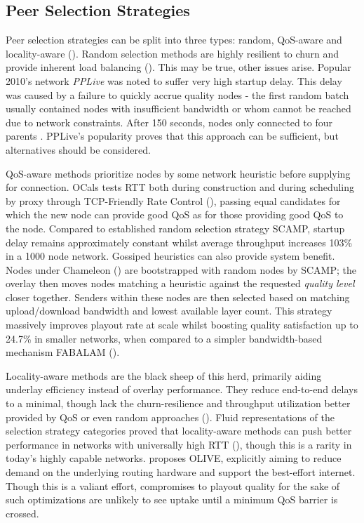 \documentclass[12pt,a4paper]{article}
\begin{document}
\subsection{Peer Selection Strategies} \label{litreview:selection}
Peer selection strategies can be split into three types: random, QoS-aware and locality-aware (\cite{Kim2018}). Random selection methods are highly resilient to churn and provide inherent load balancing  (\cite{Wang2013}). This may be true, other issues arise. Popular 2010's network \textit{PPLive} was noted to suffer very high startup delay. This delay was caused by a failure to quickly accrue quality nodes - the first random batch usually contained nodes with insufficient bandwidth or whom cannot be reached due to network constraints. After 150 seconds, nodes only connected to four parents \cite{Hei2008}. PPLive's popularity proves that this approach can be sufficient, but alternatives should be considered.

QoS-aware methods prioritize nodes by some network heuristic before supplying for connection. OCals tests RTT both during construction and during scheduling by proxy through TCP-Friendly Rate Control (\cite{Floyd2000}), passing equal candidates for which the new node can provide good QoS as for those providing good QoS to the node. Compared to established random selection strategy SCAMP, startup delay remains approximately constant whilst average throughput increases 103\% in a 1000 node network. Gossiped heuristics can also provide system benefit. Nodes under Chameleon (\cite{Nguyen2010}) are bootstrapped with random nodes by SCAMP; the overlay then moves nodes matching a heuristic against the requested \textit{quality level} closer together. Senders within these nodes are then selected based on matching upload/download bandwidth and lowest available layer count. This strategy massively improves playout rate at scale  whilst boosting quality satisfaction up to 24.7\% in smaller networks, when compared to a simpler bandwidth-based mechanism FABALAM (\cite{Liu2004}).

Locality-aware methods are the black sheep of this herd, primarily aiding underlay efficiency instead of overlay performance. They reduce end-to-end delays to a minimal, though lack the churn-resilience and throughput utilization better provided by QoS or even random approaches (\cite{Zhao2012}). Fluid representations of the selection strategy categories proved that locality-aware methods can push better performance in networks with universally high RTT (\cite{CoutodaSilva2011}), though this is a rarity in today's highly capable networks. \cite{Magharei2014} proposes OLIVE, explicitly aiming to reduce demand on the underlying routing hardware and support the best-effort internet. Though this is a valiant effort, compromises to playout quality for the sake of such optimizations are
unlikely to see uptake until a minimum QoS barrier is crossed.
\end{document}

